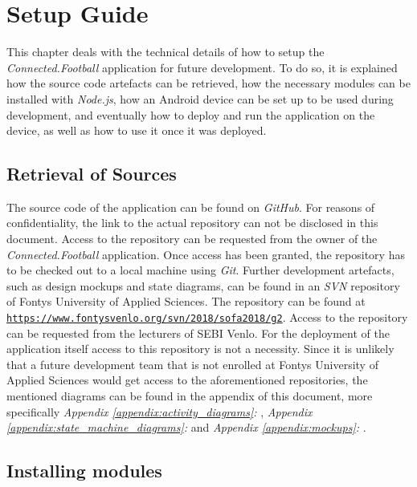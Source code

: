\section{Setup Guide}
\label{sec:Setup}

This chapter deals with the technical details of how to setup the \textit{Connected.Football} application for future development. To do so, it is explained how the source code artefacts can be retrieved, how the necessary modules can be installed with \textit{Node.js}, how an Android device can be set up to be used during development, and eventually how to deploy and run the application on the device, as well as how to use it once it was deployed. 

\subsection{Retrieval of Sources}
\label{ssec:retrieval}

The source code of the application can be found on \textit{GitHub}. For reasons of confidentiality, the link to the actual repository can not be disclosed in this document. Access to the repository can be requested from the owner of the \textit{Connected.Football} application. Once access has been granted, the repository has to be checked out to a local machine using \textit{Git}.
\newline
Further development artefacts, such as design mockups and state diagrams, can be found in an \textit{SVN} repository of Fontys University of Applied Sciences. The repository can be found at \href{https://www.fontysvenlo.org/svn/2018/sofa2018/g2}{\nolinkurl{https://www.fontysvenlo.org/svn/2018/sofa2018/g2}}. Access to the repository can be requested from the lecturers of SEBI Venlo. For the deployment of the application itself access to this repository is not a necessity.
\newline
Since it is unlikely that a future development team that is not enrolled at Fontys University of Applied Sciences would get access to the aforementioned repositories, the mentioned diagrams can be found in the appendix of this document, more specifically \textit{Appendix \ref{appendix:activity_diagrams}: }, \textit{Appendix \ref{appendix:state_machine_diagrams}: } and \textit{Appendix \ref{appendix:mockups}: }.

\subsection{Installing modules}
\label{ssec:modules}

